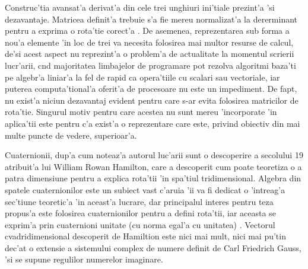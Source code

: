 \documentclass[12pt,a4paper,twoside]{report}
\begin{document}
Construc'tia avansat'a derivat'a din cele trei unghiuri ini'tiale prezint'a 'si dezavantaje. Matricea definit'a trebuie s'a fie mereu normalizat'a la dererminant pentru a exprima o rota'tie corect'a \cite{article3}. De asemenea, reprezentarea sub forma a nou'a elemente 'in loc de trei va necesita folosirea mai multor resurse de calcul, de'si acest aspect nu reprezint'a o problem'a de actualitate la momentul scrierii lucr'arii, c\ia nd majoritatea limbajelor de programare pot rezolva algoritmi baza'ti pe algebr'a liniar'a la fel de rapid ca opera'tiile cu scalari sau vectoriale, iar puterea computa'tional'a oferit'a de procesoare nu este un impediment. De fapt, nu exist'a niciun dezavantaj evident pentru care s-ar evita folosirea matricilor de rota'tie. Singurul motiv pentru care acestea nu sunt mereu 'incorporate 'in aplica'tii este pentru c'a exist'a o reprezentare care este, privind obiectiv din mai multe puncte de vedere, superioar'a.

\vspace{5px}

Cuaternionii, dup'a cum noteaz'a autorul luc'arii \cite{Jia2015QuaternionsAR} sunt o descoperire a secolului 19 atribuit'a lui William Rowan Hamilton, care a descoperit cum poate teoretiza o a patra dimensiune pentru a explica rota'tii 'in spa'tiul tridimensional. Algebra din spatele cuaternionilor este un subiect vast c'aruia 'ii va fi dedicat o 'intreag'a sec'tiune teoretic'a 'in aceast'a lucrare, dar principalul interes pentru teza propus'a este folosirea cuaternionilor pentru a defini rota'tii, iar aceasta se exprim'a prin cuaternioni unitate (cu norma egal'a cu unitatea) \cite{Jia2015QuaternionsAR}. Vectorul cvadridimensional descoperit de Hamiltion este nici mai mult, nici mai pu'tin dec'at o extensie a sistemului complex de numere \cite{quat} definit de Carl Friedrich Gauss, 'si se supune regulilor numerelor imaginare.

\vspace{5px}
\end{document}
